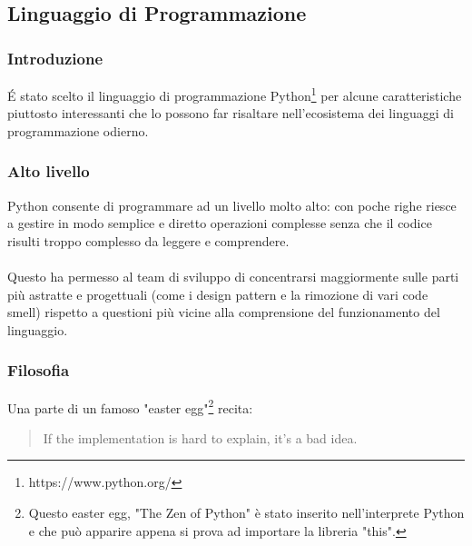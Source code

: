 \documentclass[12pt]{scrartcl}
\begin{document}
\subsection{Linguaggio di Programmazione}
\subsubsection{Introduzione}
\'E stato scelto il linguaggio di programmazione Python\footnote{https://www.python.org/} per alcune caratteristiche
piuttosto interessanti che lo possono far risaltare nell'ecosistema dei linguaggi di programmazione odierno.
\subsubsection{Alto livello}
Python consente di programmare ad un livello molto alto: con poche righe riesce a gestire
in modo semplice e diretto operazioni complesse senza che il codice risulti troppo complesso da leggere e comprendere.
\\ \\
Questo ha permesso al team di sviluppo di concentrarsi maggiormente sulle parti pi\`u astratte
e progettuali (come i design pattern e la rimozione di vari code smell) rispetto
a questioni pi\`u vicine alla comprensione del funzionamento del linguaggio.
\subsubsection{Filosofia}
Una parte di un famoso "easter egg"\footnote{Questo easter egg, "The Zen of Python"
\`e stato inserito nell'interprete Python e che pu\`o apparire appena si prova ad 
importare la libreria "this".
}
recita:
\begin{quotation}
If the implementation is hard to explain, it's a bad idea.
\end{quotation}
\end{document}
